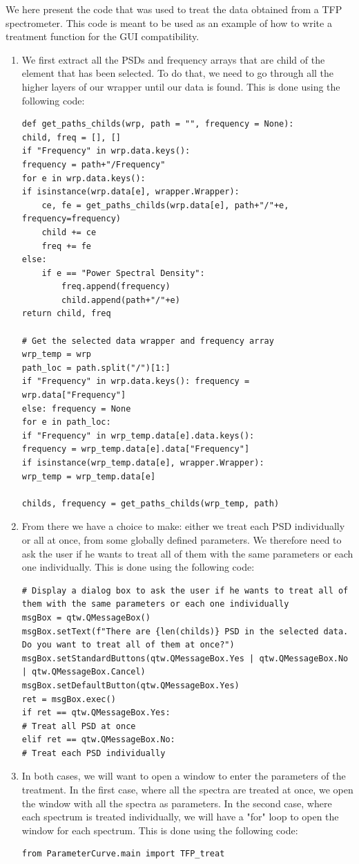 \begin{tcolorbox}
    We here present the code that was used to treat the data obtained from a TFP spectrometer. This code is meant to be used as an example of how to write a treatment function for the GUI compatibility. 
\end{tcolorbox}

\begin{enumerate}
    \item We first extract all the PSDs and frequency arrays that are child of the element that has been selected. To do that, we need to go through all the higher layers of our wrapper until our data is found. This is done using the following code:
\begin{lstlisting}
def get_paths_childs(wrp, path = "", frequency = None):
child, freq = [], []
if "Frequency" in wrp.data.keys():
frequency = path+"/Frequency"
for e in wrp.data.keys():
if isinstance(wrp.data[e], wrapper.Wrapper):
    ce, fe = get_paths_childs(wrp.data[e], path+"/"+e, frequency=frequency)
    child += ce
    freq += fe
else:
    if e == "Power Spectral Density":
        freq.append(frequency)
        child.append(path+"/"+e)
return child, freq

# Get the selected data wrapper and frequency array
wrp_temp = wrp
path_loc = path.split("/")[1:]
if "Frequency" in wrp.data.keys(): frequency = wrp.data["Frequency"]
else: frequency = None
for e in path_loc: 
if "Frequency" in wrp_temp.data[e].data.keys(): 
frequency = wrp_temp.data[e].data["Frequency"]
if isinstance(wrp_temp.data[e], wrapper.Wrapper): 
wrp_temp = wrp_temp.data[e]

childs, frequency = get_paths_childs(wrp_temp, path)
\end{lstlisting}
    \item From there we have a choice to make: either we treat each PSD individually or all at once, from some globally defined parameters. We therefore need to ask the user if he wants to treat all of them with the same parameters or each one individually. This is done using the following code:
\begin{lstlisting}
# Display a dialog box to ask the user if he wants to treat all of them with the same parameters or each one individually
msgBox = qtw.QMessageBox()        
msgBox.setText(f"There are {len(childs)} PSD in the selected data. Do you want to treat all of them at once?")
msgBox.setStandardButtons(qtw.QMessageBox.Yes | qtw.QMessageBox.No | qtw.QMessageBox.Cancel)
msgBox.setDefaultButton(qtw.QMessageBox.Yes)
ret = msgBox.exec()
if ret == qtw.QMessageBox.Yes: 
# Treat all PSD at once
elif ret == qtw.QMessageBox.No:
# Treat each PSD individually
\end{lstlisting}
    \item In both cases, we will want to open a window to enter the parameters of the treatment. In the first case, where all the spectra are treated at once, we open the window with all the spectra as parameters. In the second case, where each spectrum is treated individually, we will have a "for" loop to open the window for each spectrum. This is done using the following code:
\begin{lstlisting}
from ParameterCurve.main import TFP_treat


\end{lstlisting}
\end{enumerate}
